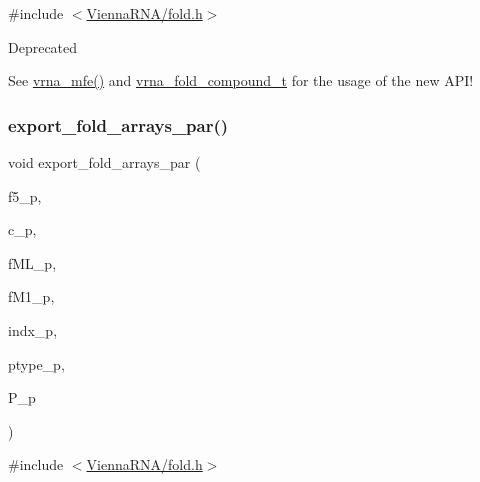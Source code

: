 {\ttfamily \#include $<$\mbox{\hyperlink{fold_8h}{Vienna\+R\+N\+A/fold.\+h}}$>$}

\begin{DoxyRefDesc}{Deprecated}
\item[\mbox{\hyperlink{deprecated__deprecated000076}{Deprecated}}]See \mbox{\hyperlink{group__mfe__fold_gabd3b147371ccf25c577f88bbbaf159fd}{vrna\+\_\+mfe()}} and \mbox{\hyperlink{group__fold__compound_ga1b0cef17fd40466cef5968eaeeff6166}{vrna\+\_\+fold\+\_\+compound\+\_\+t}} for the usage of the new A\+P\+I!\end{DoxyRefDesc}
\mbox{\label{group__mfe__fold__single_ga6606ec0ec964ea506fdadb997a1a5328}} 
\subsubsection{\texorpdfstring{export\+\_\+fold\+\_\+arrays\+\_\+par()}{export\_fold\_arrays\_par()}}
{\footnotesize\ttfamily void export\+\_\+fold\+\_\+arrays\+\_\+par (\begin{DoxyParamCaption}\item[{int $\ast$$\ast$}]{f5\+\_\+p,  }\item[{int $\ast$$\ast$}]{c\+\_\+p,  }\item[{int $\ast$$\ast$}]{f\+M\+L\+\_\+p,  }\item[{int $\ast$$\ast$}]{f\+M1\+\_\+p,  }\item[{int $\ast$$\ast$}]{indx\+\_\+p,  }\item[{char $\ast$$\ast$}]{ptype\+\_\+p,  }\item[{\mbox{\hyperlink{group__energy__parameters_ga8a69ca7d787e4fd6079914f5343a1f35}{vrna\+\_\+param\+\_\+t}} $\ast$$\ast$}]{P\+\_\+p }\end{DoxyParamCaption})}



{\ttfamily \#include $<$\mbox{\hyperlink{fold_8h}{Vienna\+R\+N\+A/fold.\+h}}$>$}

